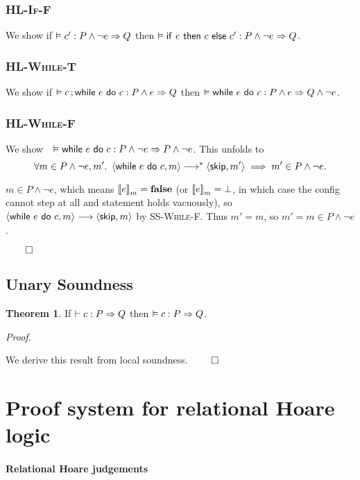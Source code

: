 \documentclass[10pt]{article}
\theoremstyle{definition}
\newtheorem{theorem}{Theorem}
\begin{document}
\subsubsection*{\textsc{HL-If-F}}
We show if $\VAL \Triple c' : P \wedge \neg e => Q$ then
    $\VAL \Triple \ITE e then c else c' : P \wedge \neg e => Q$.

\subsubsection*{\textsc{HL-While-T}}
We show if $\VAL \Triple \Seq c; \While e do c : P \wedge e => Q$ then
    $\VAL \Triple \While e do c : P \wedge e => Q \wedge \neg e$. 

\subsubsection*{\textsc{HL-While-F}}
We show~~$\VAL \Triple \While e do c : P \wedge \neg e => P \wedge \neg e$.
This unfolds to
$$\forall m \in P \wedge \neg e, m'.\
\Cfg(\While e do c,m) \sstepstotrans \Cfg(\Skip,m') \implies
m' \in P \wedge \neg e.$$

$m \in P \wedge \neg e$, which means $\Eval(e,m) = \False$
(or $\Eval(e,m) = \bot$, in which case the config cannot step at all and statement holds vacuously),
so $\Cfg(\While e do c,m) \sstepsto \Cfg(\Skip,m)$ by \textsc{SS-While-F}.
Thus $m' = m$, so $m' = m \in P \wedge \neg e$.


\hfill $\qed$

\subsection*{Unary Soundness}
\begin{theorem}
If $\DER \Triple c : P => Q$ then $\VAL \Triple c : P => Q$.
\end{theorem}

\noindent
\emph{Proof.}

\noindent
We derive this result from local soundness.
\hfill $\qed$


\newpage
\section{Proof system for relational Hoare logic}

\paragraph{Relational Hoare judgements}
\end{document}
